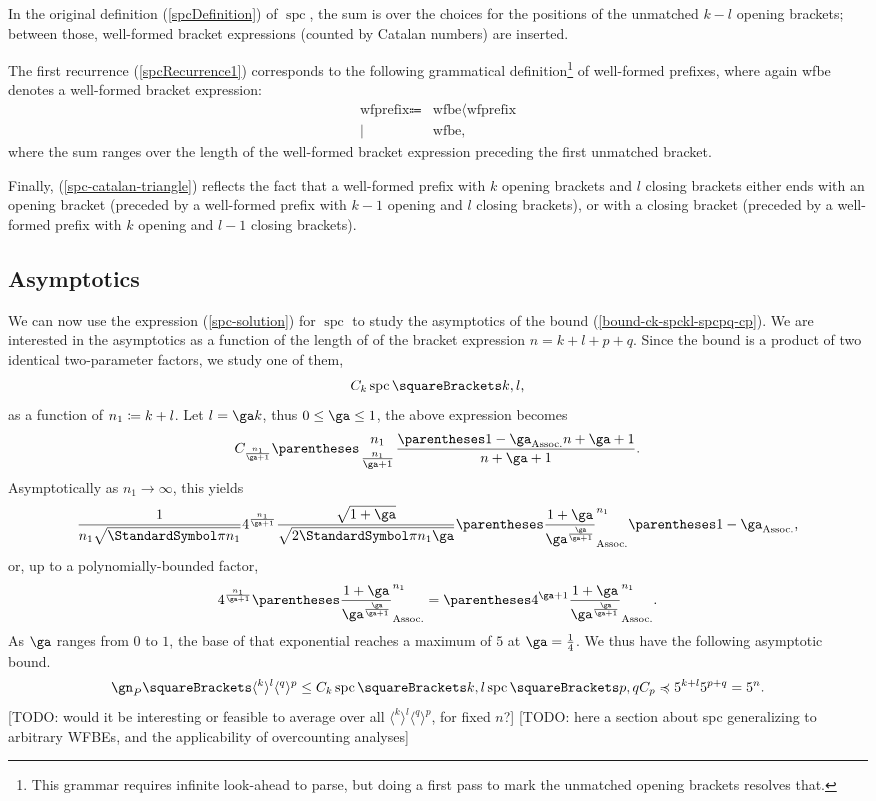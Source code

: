 \documentclass[10pt, a4paper, twoside]{basestyle}
\DeclareMathOperator{\spc}{spc}
\begin{document}
In the original definition (\ref{spcDefinition}) of $\spc$, the sum is over the choices for the positions of the
unmatched $k-l$ opening brackets; between those, well-formed bracket expressions (counted by Catalan numbers) are
inserted.

The first recurrence (\ref{spcRecurrence1}) corresponds to the following grammatical
definition\footnote{This grammar requires infinite look-ahead to parse, but doing a first pass to mark the
unmatched opening brackets resolves that.} of well-formed
prefixes, where again wfbe denotes a well-formed bracket expression:
\begin{align*}
\text{wfprefix} \Coloneq
& \text{wfbe} \langle \text{wfprefix} \\
\mid\: & \text{wfbe},
\end{align*}
where the sum ranges over the length of the well-formed bracket expression preceding the first unmatched bracket.

Finally, (\ref{spc-catalan-triangle}) reflects the fact that a well-formed prefix with $k$ opening brackets
and $l$ closing brackets either ends with an opening bracket (preceded by a well-formed prefix with $k-1$ opening
and $l$ closing brackets), or with a closing bracket (preceded by a well-formed prefix with $k$ opening
and $l-1$ closing brackets).
\subsection{Asymptotics}
We can now use the expression (\ref{spc-solution}) for $\spc$ to study the asymptotics of the bound
(\ref{bound-ck-spckl-spcpq-cp}).
We are interested in the asymptotics as a function of the length of of the bracket expression $n = k+l+p+q$.
Since the bound is a product of two identical two-parameter factors, we study one of them,\[
C_k\spc\of{k,l}\text,
\]
as a function of $n_1\coloneq k+l$. Let $l = \ga k$, thus $0\leq \ga\leq 1$,
the above expression becomes \[
C_{\frac{n_1}{\ga + 1}} \binom{n_1}{\frac{n_1}{\ga + 1}} \frac{\pa{1-\ga}n+\ga+1}{n+\ga+1}\text.
\]
Asymptotically as $n_1\longrightarrow \infty$, this yields\[
\frac
  {1}
  {n_1\sqrt{\Pi n_1}}
4^{\frac{n_1}{\ga + 1}}
\frac
  {\sqrt{1+\ga}}
  {\sqrt{2\Pi n_1 \ga}}
\pa{
  \frac
    {1+\ga}
    {\ga^{\frac{\ga}{\ga + 1}}}}^{n_1}
\pa{1-\ga}\text,
\]
or, up to a polynomially-bounded factor,\[
4^{\frac{n_1}{\ga + 1}}
\pa{
  \frac
    {1+\ga}
    {\ga^{\frac{\ga}{\ga + 1}}}}^{n_1}
=
\pa{
4^{\ga + 1}
\frac
  {1+\ga}
  {\ga^{\frac{\ga}{\ga + 1}}}}^{n_1}\text.
\]
As $\ga$ ranges from $0$ to $1$, the base of that exponential reaches a maximum of $5$ at
$\ga=\frac 1 4$. We thus have the following asymptotic bound.\begin{equation}
\gn_P\of{\langle^k\rangle^l\langle^q\rangle^p}\leq
C_k\spc\of{k, l}\spc\of{p, q}C_p
\preccurlyeq
5^{k+l}5^{p+q} = 5^n
\text.
\end{equation}
[TODO: would it be interesting or feasible to average over all $\langle^k\rangle^l\langle^q\rangle^p$,
for fixed $n$?]
[TODO: here a section about spc generalizing to arbitrary WFBEs, and the applicability of overcounting
analyses]
\clearpage
\nocite{*}


\end{document}
